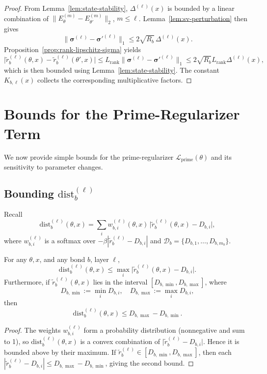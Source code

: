 \documentclass[11pt]{article}
\begin{document}
\begin{proof}
From Lemma~\ref{lem:state-stability}, $\Delta^{(\ell)}(x)$ is bounded by a linear combination of $\|E^{(m)}_\theta - E^{(m)}_{\theta'}\|_2$, $m\le \ell$. Lemma~\ref{lem:sv-perturbation} then gives
\[
\|\bm{\sigma}^{(\ell)} - \bm{\sigma}'^{(\ell)}\|_1
\le 2\sqrt{R_b}\,\Delta^{(\ell)}(x).
\]
Proposition~\ref{prop:rank-lipschitz-sigma} yields
\[
\big|\tilde{r}_b^{(\ell)}(\theta,x) - \tilde{r}_b^{(\ell)}(\theta',x)\big|
\le L_{\mathrm{rank}} \|\bm{\sigma}^{(\ell)} - \bm{\sigma}'^{(\ell)}\|_1
\le 2\sqrt{R_b} L_{\mathrm{rank}} \Delta^{(\ell)}(x),
\]
which is then bounded using Lemma~\ref{lem:state-stability}. The constant $K_{b,\ell}(x)$ collects the corresponding multiplicative factors.
\end{proof}


\section{Bounds for the Prime-Regularizer Term}

We now provide simple bounds for the prime-regularizer $\mathcal{L}_{\mathrm{prime}}(\theta)$ and its sensitivity to parameter changes.

\subsection{Bounding $\mathrm{dist}_b^{(\ell)}$}

Recall
\[
\mathrm{dist}_b^{(\ell)}(\theta,x)
= \sum_{i} w_{b,i}^{(\ell)}(\theta,x)\,\big|\tilde{r}_b^{(\ell)}(\theta,x) - D_{b,i}\big|,
\]
where $w_{b,i}^{(\ell)}$ is a softmax over $-\beta|\tilde{r}_b^{(\ell)} - D_{b,i}|$ and $\mathcal{D}_b = \{D_{b,1},\dots,D_{b,m_b}\}$.

\begin{lemma}
\label{lem:dist-upper-bound}
For any $\theta,x$, and any bond $b$, layer $\ell$,
\[
\mathrm{dist}_b^{(\ell)}(\theta,x)
\le \max_{i} \big|\tilde{r}_b^{(\ell)}(\theta,x) - D_{b,i}\big|.
\]
Furthermore, if $\tilde{r}_b^{(\ell)}(\theta,x)$ lies in the interval $[D_{b,\min},D_{b,\max}]$, where
\[
D_{b,\min} := \min_i D_{b,i},\quad D_{b,\max}:=\max_i D_{b,i},
\]
then
\[
\mathrm{dist}_b^{(\ell)}(\theta,x)
\le D_{b,\max} - D_{b,\min}.
\]
\end{lemma}

\begin{proof}
The weights $w_{b,i}^{(\ell)}$ form a probability distribution (nonnegative and sum to 1), so $\mathrm{dist}_b^{(\ell)}(\theta,x)$ is a convex combination of $\big|\tilde{r}_b^{(\ell)} - D_{b,i}\big|$. Hence it is bounded above by their maximum. If $\tilde{r}_b^{(\ell)}\in[D_{b,\min},D_{b,\max}]$, then each $|\tilde{r}_b^{(\ell)} - D_{b,i}| \le D_{b,\max} - D_{b,\min}$, giving the second bound.
\end{proof}
\end{document}
